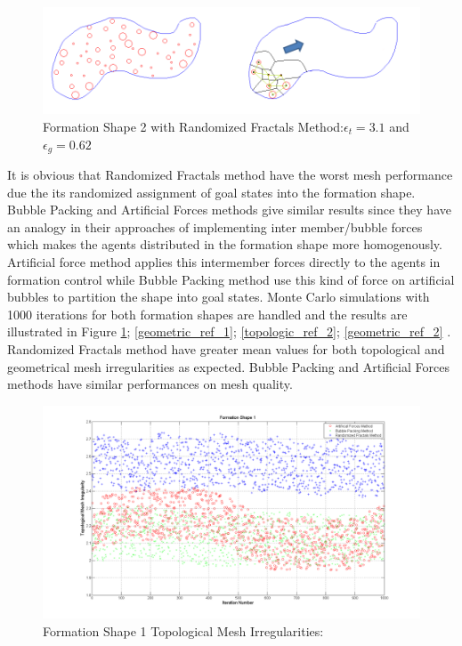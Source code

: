 \begin{figure}[H]
\caption{Formation Shape 2 with Randomized Fractals Method:$\epsilon_t = 3.1$ and $\epsilon_g = 0.62$}
\centerline{\includegraphics[scale = 0.65]{Randomized_Fractals_Mesh_2}}
\end{figure} 	

It is obvious that Randomized Fractals method have the worst mesh performance due the its randomized assignment of goal states into the formation shape. Bubble Packing and Artificial Forces methods give similar results since they have an analogy in their approaches of implementing inter member/bubble forces which makes the agents distributed in the formation shape more homogenously. Artificial force method applies this intermember forces directly to the agents in formation control while Bubble Packing method use this kind of force on artificial bubbles to partition the shape into goal states. Monte Carlo simulations with 1000 iterations for both formation shapes are handled and the results are illustrated in Figure \ref{topologic_ref_1}; \ref{geometric_ref_1}; \ref{topologic_ref_2}; \ref{geometric_ref_2} . Randomized Fractals method have greater mean values for both topological and geometrical mesh irregularities as expected.  Bubble Packing and Artificial Forces methods have similar performances on mesh quality.
		
\begin{figure}[H]
\caption{Formation Shape 1 Topological Mesh Irregularities:} \label{topologic_ref_1}
\centerline{\includegraphics[scale = 0.40]{Topological_Irr_1}}
\end{figure} 	
		
